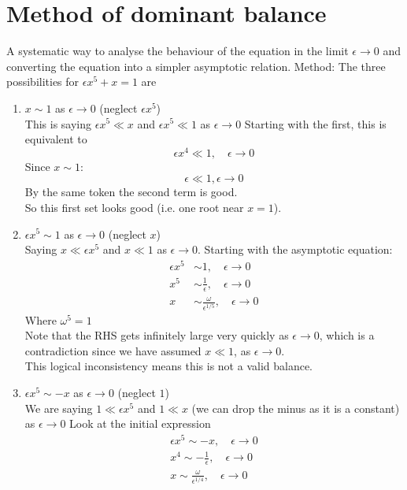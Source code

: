 \documentclass{X:/Documents/Coding/Latex/myassignment}
\begin{document}
\section*{Method of dominant balance}
A systematic way to analyse the behaviour of the equation in the limit $\epsilon\to0$ and converting the equation into a simpler asymptotic relation.
Method:
The three possibilities for $\epsilon x^5 + x =1 $ are
\begin{enumerate}
    \item $x\sim 1$ as $\epsilon\to 0$ (neglect $\epsilon x^5$)\\
    This is saying $\epsilon x^5 \ll x$ and $\epsilon x^5 \ll 1$ as $\epsilon\to 0$
    Starting with the first, this is equivalent to
    \[\epsilon x^4 \ll 1, \quad \epsilon\to 0\]
    Since $x\sim 1$:
    \[\epsilon \ll 1, \epsilon\to 0\]
    By the same token the second term is good.\\
    So this first set looks good (i.e. one root near $x=1$).
    \item $\epsilon x^5 \sim 1$ as $\epsilon\to 0$ (neglect $x$)\\
    Saying $x \ll \epsilon x^5$ and $x\ll 1$ as $\epsilon\to0$. Starting with the asymptotic equation:
    \begin{align*}
        \epsilon x^5 &\sim 1,\quad \epsilon\to 0\\
        x^5 &\sim \frac1\epsilon, \quad \epsilon\to 0\\
        x &\sim \frac{\omega}{\epsilon^{1/5}}, \quad \epsilon\to 0
    \end{align*}
    Where $\omega^5 =1$\\
    Note that the RHS gets infinitely large very quickly as $\epsilon\to0$, which is a contradiction since we have assumed $x \ll 1$, as $\epsilon\to 0$.\\
    This logical inconsistency means this is not a valid balance.
    \item $\epsilon x^5 \sim -x$ as $\epsilon\to 0$ (neglect $1$)\\
    We are saying $1\ll \epsilon x^5$ and $1\ll x$ (we can drop the minus as it is a constant) as $\epsilon\to 0$ 
    Look at the initial expression
    \begin{align*}
        \epsilon x^5 \sim -x, \quad \epsilon\to 0\\
         x^4\sim -\frac{1}{\epsilon},\quad \epsilon\to0\\
         x \sim \frac{\omega}{\epsilon^{1/4}}, \quad \epsilon\to0
    \end{align*}

\end{enumerate}
\end{document}
